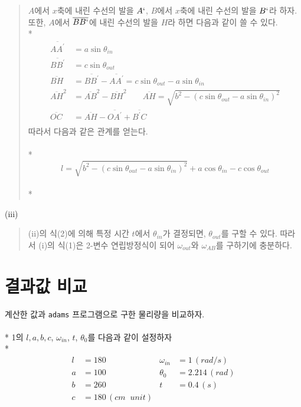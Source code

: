 \documentclass{article}
\begin{document}
\begin{quote}
    $A$에서 $x$축에 내린 수선의 발을 $A`$, $B$에서 $x$축에 내린 수선의 발을 $B`$라 하자.\\
    또한, $A$에서 $\overline{BB`}$에 내린 수선의 발을 $H$라 하면 다음과 같이 쓸 수 있다.\\*
    \begin{align*}
        \overline{AA^\prime} &= a\sin\theta_{in}\\
        \overline{BB^\prime} &= c\sin\theta_{out}\\
        \overline{BH} &= \overline{BB^\prime} - \overline{AA^\prime} = c\sin\theta_{out} - a\sin\theta_{in}\\
        \overline{AH}^2 \!\!&= \overline{AB}^2 - \overline{BH}^2 \;\;\;\;\;\;\; \overline{AH}=\sqrt{b^2 -(c\sin\theta_{out}-a\sin\theta_{in})^2}\\
        \overline{OC}&=\overline{AH}-\overline{OA^\prime}+\overline{B^\prime C}\\
    \end{align*}
    따라서 다음과 같은 관계를 얻는다.\\\\*
    \begin{equation}
    l=\sqrt{b^2 -(c\sin\theta_{out}-a\sin\theta_{in})^2}+a\cos\theta_{in}-c\cos\theta_{out}
    \end{equation}
 \\*
\end{quote}


(iii)
\begin{quote}
    (ii)의 식(2)에 의해 특정 시간 $t$에서 $\theta_{in}$가 결정되면, $\theta_{out}$를 구할 수 있다. 따라서 (i)의 식(1)은 2-변수 연립방정식이 되어 $\omega_{out}$와 $\omega_{AB}$를 구하기에 충분하다.
\end{quote}
    
\pagebreak
    
\section{결과값 비교}
 계산한 값과 \verb+adams+ 프로그램으로 구한 물리량을 비교하자.\\\\*
\indent1의 $l, a, b, c$, $\omega_{in}$, $t$, $\theta_0$를 다음과 같이 설정하자\\*
\begin{align*}
	l&=180 & \omega_{in}&=1\,(rad/s)\\
	a&=100 & \theta_0&=2.214\,(rad)\\
	b&=260 & t&=0.4\,(s)\\
	c&=180 \,(cm \;\;unit)
\end{align*}\\
\end{document}

